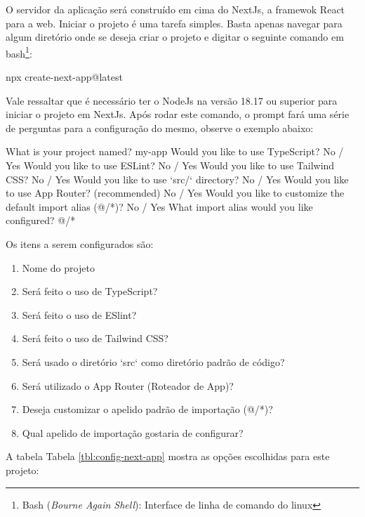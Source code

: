 O servidor da aplicação será construído em cima do NextJs, a
framewok React para a
\acrshort{web}.
Iniciar o projeto é uma tarefa simples. Basta apenas navegar
para algum diretório onde se deseja criar o projeto e
digitar o seguinte comando em
\acrshort{bash}\footnote{Bash (\textit{Bourne Again Shell}): Interface de linha de comando do linux
}:

\begin{createNextJsCommand}
npx create-next-app@latest
\end{createNextJsCommand}

Vale ressaltar que é necessário ter o NodeJs na versão 18.17 ou superior
para iniciar o projeto em NextJs. Após rodar este comando, o prompt fará uma
série de perguntas para a configuração do mesmo, observe o exemplo abaixo:

\begin{promptNextJs}
What is your project named? my-app
Would you like to use TypeScript? No / Yes
Would you like to use ESLint? No / Yes
Would you like to use Tailwind CSS? No / Yes
Would you like to use `src/` directory? No / Yes
Would you like to use App Router? (recommended) No / Yes
Would you like to customize the default import alias (@/*)? No / Yes
What import alias would you like configured? @/*
\end{promptNextJs}

Os itens a serem configurados são:

\begin{enumerate}
        
	\item Nome do projeto
	\item Será feito o uso de TypeScript?
	\item Será feito o uso de ESlint?
	\item Será feito o uso de Tailwind CSS?
	\item Será usado o diretório `src` como diretório padrão de código?
	\item Será utilizado o App Router (Roteador de App)?
	\item Deseja customizar o apelido padrão de importação (@/*)?
	\item Qual apelido de importação gostaria de configurar?
    
\end{enumerate}

A tabela
Tabela \ref{tbl:config-next-app}
mostra as opções escolhidas para este projeto:

